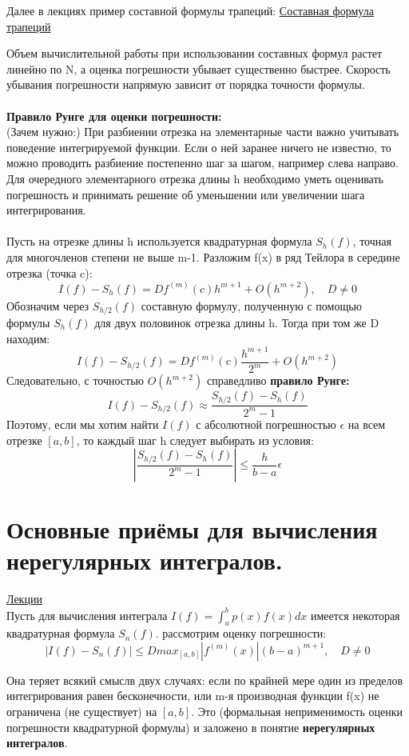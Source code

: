 \documentclass[specialist, subf, href, colorlinks=true, 12pt, times, mtpro, final]{disser}
\theoremstyle{definition}
\begin{document}
     Далее в лекциях пример составной формулы трапеций: \hyperlink {lects.44}{Составная формула трапеций}
     
     Объем вычислительной работы при использовании составных формул растет линейно по N, а оценка погрешности убывает существенно быстрее. Скорость убывания погрешности напрямую зависит от порядка точности формулы.
     \\ \\ 
     \textbf{Правило Рунге для оценки погрешности:}\\
     (Зачем нужно:) При разбиении отрезка на элементарные части важно учитывать поведение интегрируемой функции. Если о ней заранее ничего не известно, то можно проводить разбиение постепенно шаг за шагом, например слева направо. Для очередного элементарного отрезка длины h необходимо уметь оценивать погрешность и принимать решение об уменьшении или увеличении шага интегрирования. 
     \\ \\
     Пусть на отрезке длины h используется квадратурная формула $S_h(f)$, точная для многочленов степени не выше m-1. Разложим f(x) в ряд Тейлора в середине отрезка (точка c):
     $$I(f) - S_h(f) = Df^{(m)}(c)h^{m+1} + O(h^{m+2}), \quad D \not= 0$$ 
     Обозначим через $S_{h/2}(f)$ составную формулу, полученную с помощью формулы $S_h(f)$ для двух половинок отрезка длины h. Тогда при том же D находим:
     $$I(f) - S_{h/2}(f) = Df^{(m)}(c) \frac{h^{m+1}}{2^m} + O(h^{m+2})$$
     Следовательно, с точностью $O(h^{m+2})$ справедливо \textbf{правило Рунге:}
     $$\boxed {I(f) - S_{h/2}(f) \approx \frac{S_{h/2}(f) - S_h(f)}{2^m - 1}}$$
     Поэтому, если мы хотим найти $I(f)$ с абсолютной погрешностью $\epsilon$ на всем отрезке $[a, b]$, то каждый шаг h следует выбирать из условия:
     $$|\frac{S_{h/2}(f) - S_h(f)}{2^m - 1}| \leq \frac{h}{b-a}\epsilon$$

\section {Основные приёмы для вычисления нерегулярных интегралов.}
    \hyperlink {lects.45}{Лекции}\\
    Пусть для вычисления интеграла $I(f) = \int_a^b p(x)f(x)dx$ имеется некоторая квадратурная формула $S_n(f)$. рассмотрим оценку погрешности:
    $$|I(f) - S_n(f)| \leq D max_{[a, b]}|f^{(m)}(x)|(b-a)^{m+1}, \quad D \not = 0$$

    Она теряет всякий смыслв двух случаях: если по крайней мере один из пределов интегрирования равен бесконечности, или m-я производная функции f(x) не ограничена (не существует) на $[a, b]$. Это (формальная неприменимость оценки погрешности квадратурной формулы) и заложено в понятие \textbf{нерегулярных интегралов}. 
    
\end{document}
